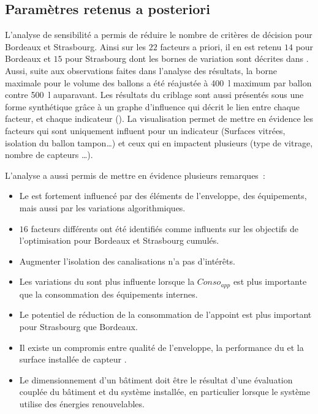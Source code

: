 \subsection{Paramètres retenus a posteriori} %
\label{sub:parametres_retenus_a_posteriori}
L’analyse de sensibilité a permis de réduire le nombre de critères de décision
pour Bordeaux et Strasbourg. Ainsi sur les $22$ facteurs a priori, il en est retenu
$14$ pour Bordeaux et $15$ pour Strasbourg dont les bornes de variation sont décrites
dans .
Aussi, suite aux observations faites dans l’analyse des résultats, la borne maximale pour le volume des
ballons a été réajustée à \SI{400}{\litre} maximum par ballon contre \SI{500}{\litre}
auparavant.
Les résultats du criblage sont aussi présentés sous une forme synthétique grâce à un
graphe d’influence qui décrit le lien entre chaque facteur, et chaque indicateur
(). La visualisation permet de mettre en évidence
les facteurs qui sont uniquement influent pour un indicateur (Surfaces vitrées, isolation du ballon tampon\dots) et
ceux qui en impactent plusieurs (type de vitrage, nombre de capteurs \dots).

L’analyse a aussi permis de mettre en évidence plusieurs remarques~:
\begin{itemize}
  \item Le  est fortement influencé par des éléments de l’enveloppe, des équipements,
        mais aussi par les variations algorithmiques.
  \item $16$ facteurs différents ont été identifiés comme influents sur les objectifs de
        l’optimisation pour Bordeaux et Strasbourg cumulés.
  \item Augmenter l’isolation des canalisations n’a pas d’intérêts.
  \item Les variations du  sont plus influente lorsque la $Conso_{app}$
        est plus importante que la consommation des équipements internes.
  \item Le potentiel de réduction de la consommation de l’appoint est plus important
        pour Strasbourg que Bordeaux.
  \item Il existe un compromis entre qualité de l’enveloppe, la performance du 
        et la surface installée de capteur .
  \item Le dimensionnement d’un bâtiment doit être le résultat d’une évaluation
        couplée du bâtiment et du système installée, en particulier lorsque le système
        utilise des énergies renouvelables.
\end{itemize}

